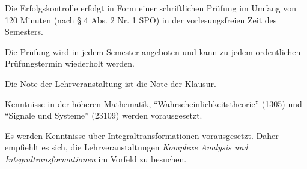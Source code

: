 \begin{course}

\setdoclanguagegerman
{}



\coursehead


\label{cour_6891.dp_997}


\begin{styleenv}
\begin{assessment}
Die Erfolgskontrolle erfolgt in Form einer schriftlichen Prüfung im Umfang von 120 Minuten (nach § 4 Abs. 2 Nr. 1 SPO) in der vorlesungsfreien Zeit des Semesters.

 

Die Prüfung wird in jedem Semester angeboten und kann zu jedem ordentlichen Prüfungstermin wiederholt werden.

 

Die Note der Lehrveranstaltung ist die Note der Klausur.


\end{assessment}

\begin{conditions}Kenntnisse in der höheren Mathematik, “Wahrscheinlichkeitstheorie” (1305) und “Signale und Systeme” (23109) werden vorausgesetzt.

\end{conditions}

\begin{recommendations}Es werden Kenntnisse über Integraltransformationen vorausgesetzt. Daher empfiehlt es sich, die Lehrveranstaltungen \emph{Komplexe Analysis und Integraltransformationen} im Vorfeld zu besuchen.

\end{recommendations}
\end{styleenv}


\end{course}
